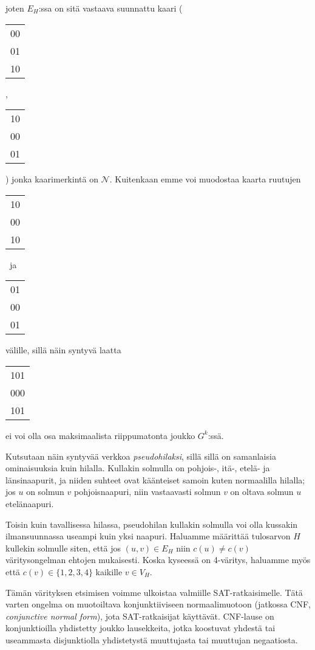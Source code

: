 \documentclass[12pt,finnish]{tktltiki2}
\theoremstyle{definition}
\theoremstyle{remark}
\begin{document}
joten $E_H$:ssa on sitä vastaava suunnattu kaari \Bigg(
\begin{tabular}{ | c | }
  \hline
  00 \\
  01 \\
  10 \\
  \hline
\end{tabular}
,
\begin{tabular}{ | c | }
  \hline
  10 \\
  00 \\
  01 \\
  \hline
\end{tabular}
\Bigg) jonka kaarimerkintä on $\mathcal{N}$. Kuitenkaan emme voi muodostaa kaarta ruutujen
\begin{center}
\begin{tabular}{| c |}
 \hline
 10 \\
 00 \\
 10 \\
 \hline
\end{tabular}
~ja~
\begin{tabular}{| c |}
 \hline
 01 \\
 00 \\
 01 \\
 \hline
\end{tabular}
\end{center}
välille, sillä näin syntyvä laatta
\begin{tabular}{| c |}
 \hline
 101 \\
 000 \\
 101 \\
 \hline
\end{tabular}
ei voi olla osa maksimaalista riippumatonta joukko $G^k$:ssä.

Kutsutaan näin syntyvää verkkoa \textit{pseudohilaksi}, sillä sillä on samanlaisia ominaisuuksia kuin hilalla. Kullakin solmulla on pohjois-, itä-, etelä- ja länsinaapurit, ja niiden suhteet ovat käänteiset samoin kuten normaalilla hilalla; jos $u$ on solmun $v$ pohjoisnaapuri, niin vastaavasti solmun $v$ on oltava solmun $u$ etelänaapuri.

Toisin kuin tavallisessa hilassa, pseudohilan kullakin solmulla voi olla kussakin ilmansuunnassa useampi kuin yksi naapuri. Haluamme määrittää tulosarvon $H$ kullekin solmulle siten, että jos $(u, v) \in E_H$ niin $c(u) \neq c(v)$ väritysongelman ehtojen mukaisesti. Koska kyseessä on 4-väritys, haluamme myös että $c(v) \in \{1, 2, 3, 4\}$ kaikille $v \in V_H$.

Tämän värityksen etsimisen voimme ulkoistaa valmiille SAT-ratkaisimelle. Tätä varten ongelma on muotoiltava konjunktiiviseen normaalimuotoon (jatkossa CNF, \textit{conjunctive normal form}), jota SAT-ratkaisijat käyttävät. CNF-lause on konjunktioilla yhdistetty joukko lausekkeita, jotka koostuvat yhdestä tai useammasta disjunktiolla yhdistetystä muuttujasta tai muuttujan negaatiosta.
\end{document}
